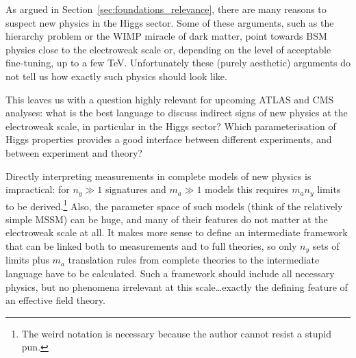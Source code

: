 

As argued in Section~\ref{sec:foundations_relevance}, there are many
reasons to suspect new physics in the Higgs sector. Some of these
arguments, such as the hierarchy problem or the WIMP miracle of dark
matter, point towards BSM physics close to the electroweak scale or,
depending on the level of acceptable fine-tuning, up to a few
TeV. Unfortunately these (purely aesthetic) arguments do not tell us
how exactly such physics should look like.

This leaves us with a question highly relevant for upcoming ATLAS and
CMS analyses: what is the best language to discuss indirect signs of
new physics at the electroweak scale, in particular in the Higgs
sector? Which parameterisation of Higgs properties provides a good
interface between different experiments, and between experiment and
theory?

Directly interpreting measurements in complete models of new physics
is impractical: for $n_y \gg 1$ signatures and $m_a \gg 1$ models this
requires $m_a n_y$ limits to be derived.\footnote{The weird notation
  is necessary because the author cannot resist a stupid pun.} Also,
the parameter space of such models (think of the relatively simple
MSSM) can be huge, and many of their features do not matter at the
electroweak scale at all. It makes more sense to define an
intermediate framework that can be linked both to measurements and to
full theories, so only $n_y$ sets of limits plus $m_a$ translation
rules from complete theories to the intermediate language have to be
calculated. Such a framework should include all necessary physics, but
no phenomena irrelevant at this scale\dots exactly the defining
feature of an effective field theory.




